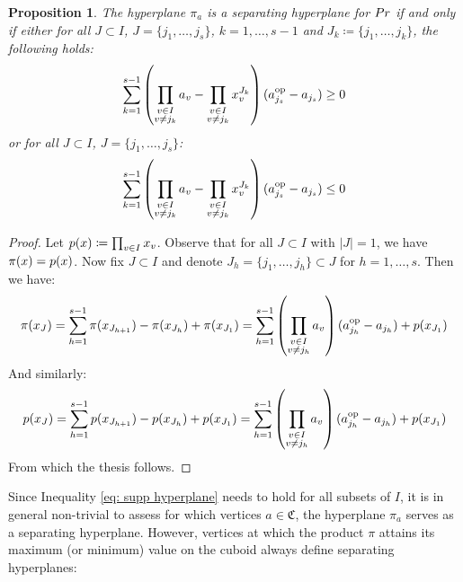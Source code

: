 \documentclass{article}
\newtheorem{proposition}[theorem]{Proposition}
\begin{document}
\begin{proposition}
	\label{prop: sufficient and necessary sep hyperplane}
	The hyperplane \(\pi_a\) is a separating hyperplane for \(Pr\) if and only if either for all \(J \subset I\), \(J = \{j_1,\ldots,j_s\}\), \(k = 1,\ldots,s-1\) and \(J_k \coloneqq \{j_1,\ldots,j_k\}\), the following holds:
	\begin{equation}
		\sum_{k = 1}^{s-1} \left(\prod_{\substack{v \in I \\ v \neq j_k}}a_v - \prod_{\substack{v \in I \\ v \neq j_k}}{x^{J_k}_v}\right) (a^{\text{op}}_{j_s}-a_{j_s})\geq 0
	\end{equation}
	or for all \(J \subset I\), \(J = \{j_1,\ldots,j_s\}\): 
	\begin{equation}
		\sum_{k = 1}^{s-1} \left(\prod_{\substack{v \in I \\ v \neq j_k}}a_v - \prod_{\substack{v \in I \\ v \neq j_k}}x^{J_k}_v\right) (a^{\text{op}}_{j_s}-a_{j_s})\leq 0
	\end{equation}
	
\end{proposition}
\begin{proof}

Let \(p(x) \coloneqq \prod_{v \in I}x_v\).	Observe that for all \(J \subset I\) with \(|J| = 1\), we have \(\pi(x) = p(x)\).
%
 Now fix \(J \subset I\) and denote \(J_h = \{j_1,\ldots,j_h\} \subset J\) for \(h=1,\ldots,s\).
	Then we have:
	\begin{equation}
		\label{eq: supp hyperplane}
		\pi(x_J) = \sum_{h=1}^{s-1} \pi({x_{J_{h+1}}}) - \pi({x_{J_{h}}}) + \pi({x_{J_1}}) = \sum_{h=1}^{s-1}  \left(\prod_{\substack{v \in I \\ v \neq j_h}}a_v\right)(a^{\text{op}}_{j_h}-a_{j_h}) + p({x_{J_1}})
	\end{equation}
	And similarly:
	\begin{equation}
		p({x_J})  = \sum_{h=1}^{s-1} p({x_{J_{h+1}}}) - p({x_{J_{h}}}) + p({x_{J_1}}) = \sum_{h=1}^{s-1}  \left(\prod_{\substack{v \in I \\ v \neq j_h}} a_v\right)(a^{\text{op}}_{j_h}-a_{j_h}) + p({x_{J_1}})
	\end{equation}
	From which the thesis follows.
	\end{proof}
Since Inequality \eqref{eq: supp hyperplane} needs to hold for all subsets of \(I\), it is in general non-trivial to assess for which vertices \(a \in \mathfrak{C}\), the hyperplane \(\pi_a\) serves as a separating hyperplane. 
However, vertices at which the product \(\pi\) attains its maximum (or minimum) value on the cuboid always define separating hyperplanes:
\end{document}
